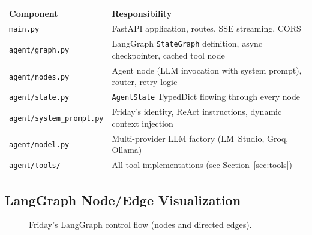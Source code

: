 \documentclass[11pt,a4paper]{article}
\begin{document}
\begin{table}[h!]
\centering
\begin{tabular}{@{}lp{9cm}@{}}
\toprule
\textbf{Component} & \textbf{Responsibility} \\
\midrule
\texttt{main.py} & FastAPI application, routes, SSE streaming, CORS \\
\texttt{agent/graph.py} & LangGraph \texttt{StateGraph} definition, async checkpointer, cached tool node \\
\texttt{agent/nodes.py} & Agent node (LLM invocation with system prompt), router, retry logic \\
\texttt{agent/state.py} & \texttt{AgentState} TypedDict flowing through every node \\
\texttt{agent/system\_prompt.py} & Friday's identity, ReAct instructions, dynamic context injection \\
\texttt{agent/model.py} & Multi-provider LLM factory (LM~Studio, Groq, Ollama) \\
\texttt{agent/tools/} & All tool implementations (see Section~\ref{sec:tools}) \\
\bottomrule
\end{tabular}
\end{table}

\subsection{LangGraph Node/Edge Visualization}

\begin{figure}[h!]
\centering
{}
\caption{Friday's LangGraph control flow (nodes and directed edges).}
\end{figure}
\end{document}
